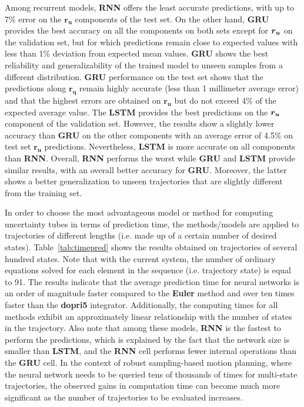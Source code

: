 Among recurrent models, \textbf{RNN} offers the least accurate predictions, with up to 7\% error on the $\boldsymbol{r_u}$ components of the test set.
On the other hand, \textbf{GRU} provides the best accuracy on all the components on both sets except for $\boldsymbol{r_u}$ on the validation set, but for which predictions remain close to expected values with less than 1\% deviation from expected mean values.
\textbf{GRU} shows the best reliability and generalizability of the trained model to unseen samples from a different distribution.
\textbf{GRU} performance on the test set shows that the predictions along $\boldsymbol{r_q}$ remain highly accurate (less than 1 millimeter average error) and that the highest errors are obtained on $\boldsymbol{r_u}$ but do not exceed 4\% of the expected average value.
The \textbf{LSTM} provides the best predictions on the $\boldsymbol{r_u}$ component of the validation set. 
However, the results show a slightly lower accuracy than \textbf{GRU} on the other components with an average error of 4.5\% on test set $\boldsymbol{r_u}$ predictions.
Nevertheless, \textbf{LSTM} is more accurate on all components than \textbf{RNN}.
Overall, \textbf{RNN} performs the worst while \textbf{GRU} and \textbf{LSTM} provide similar results, with an overall better accuracy for \textbf{GRU}.
Moreover, the latter shows a better generalization to unseen trajectories that are slightly different from the training set.

In order to choose the most advantageous model or method for computing uncertainty tubes in terms of prediction time, the methods/models are applied to trajectories of different lengths (i.e. made up of a certain number of desired states). 
Table~\ref{tab:timepred} shows the results obtained on trajectories of several hundred states. 
Note that with the current system, the number of ordinary equations solved for each element in the sequence (i.e. trajectory state) is equal to 91.
The results indicate that the average prediction time for neural networks is an order of magnitude faster compared to the \textbf{Euler} method and over ten times faster than the \textbf{dopri5} integrator. 
Additionally, the computing times for all methods exhibit an approximately linear relationship with the number of states in the trajectory.
Also note that among these models, \textbf{RNN} is the fastest to perform the predictions, which is explained by the fact that the network size is smaller than \textbf{LSTM}, and the \textbf{RNN} cell performs fewer internal operations than the \textbf{GRU} cell.
In the context of robust sampling-based motion planning, where the neural network needs to be queried tens of thousands of times for multi-state trajectories, the observed gains in computation time can become much more significant as the number of trajectories to be evaluated increases.

